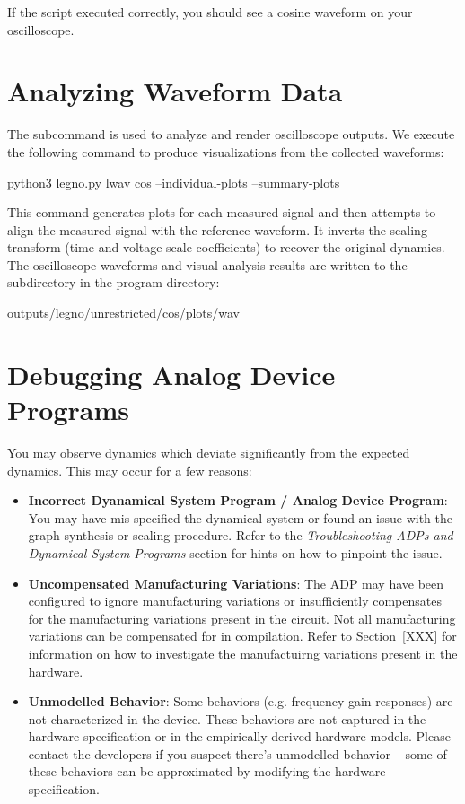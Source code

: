 If the script executed correctly, you should see a cosine waveform on your
oscilloscope.


\section{Analyzing Waveform Data}

The  subcommand is used to analyze and render oscilloscope outputs. We
execute the following command to produce visualizations from the collected waveforms: 

\begin{snippet}
python3 legno.py lwav cos --individual-plots --summary-plots
\end{snippet}

This command generates plots for each measured signal and then attempts to align
the measured signal with the reference waveform. It inverts the scaling
transform (time and voltage scale coefficients) to recover the original
dynamics. The oscilloscope waveforms and visual analysis results are written to the
 subdirectory in the program directory:

\begin{snippet}
  outputs/legno/unrestricted/cos/plots/wav
\end{snippet}


\section{Debugging Analog Device Programs}

You may observe dynamics which deviate significantly from the expected dynamics.
This may occur for a few reasons:

\begin{itemize}
\item\textbf{Incorrect Dyanamical System Program / Analog Device Program}: You
  may have mis-specified the dynamical system or found an issue with the graph
  synthesis or scaling procedure. Refer to the \textit{Troubleshooting ADPs and
    Dynamical System Programs} section for hints on how to pinpoint the issue. 

\item\textbf{Uncompensated Manufacturing Variations}: The ADP may have been
  configured to ignore manufacturing variations or insufficiently compensates
  for the manufacturing variations present in the circuit. Not all manufacturing
  variations can be compensated for in compilation. Refer to Section~\ref{XXX}
  for information on how to investigate the manufactuirng variations present in
  the hardware.

\item\textbf{Unmodelled Behavior}: Some behaviors (e.g. frequency-gain
  responses) are not characterized in the device. These behaviors are not
  captured in the hardware specification or in the empirically derived hardware
  models. Please contact the developers if you suspect there's unmodelled behavior
  -- some of these behaviors can be approximated by modifying the hardware
  specification.
\end{itemize}


